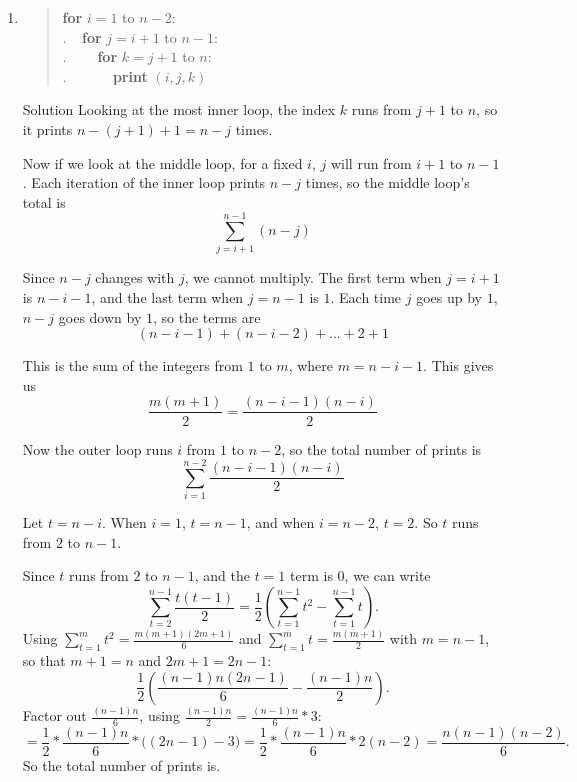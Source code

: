 \documentclass[10pt,letterpaper,unboxed,cm]{article}
\newcommand{\ind}{$~~~~~$}
\begin{document}
\begin{enumerate}
\begin{enumerate}
\begin{frame}{Solution}
Looking at the inner loop it will run \(2n-2i+1\) times.

Now summing the iterations of the inner loop over the outer loop, the total is.

\[\sum_{i=1}^n (2n-2i+1) = \sum_{i=1}^n2n - \sum_{i=1}^n2i +\sum_{i=1}^n1\]

Which will give us 

\[2n^2-(n^2+n)+n=n^2\]

Which is \(\Theta(n^2)\)


\end{frame}

\item
\begin{quote}
{\bf for} $i=1$ to $n-2$:\\
.\ind{\bf for} $j=i+1$ to $n-1$:\\
.\ind\ind{\bf for} $k=j+1$ to $n$:\\
.\ind\ind\ind {\bf print} $(i,j,k)$
\end{quote}

\begin{frame}{Solution}
Looking at the most inner loop, the index \(k\) runs from \(j+1\) to \(n\), so it prints \(n-(j+1)+1 = n-j\) times.

Now if we look at the middle loop, for a fixed \(i\), \(j\) will run from \(i+1\) to \(n-1\). Each iteration of the inner loop prints \(n-j\) times, so the middle loop's total is
\[
\sum_{j=i+1}^{n-1}(n-j)
\]

Since \(n-j\) changes with \(j\), we cannot multiply. The first term when \(j=i+1\) is \(n-i-1\), and the last term when \(j=n-1\) is \(1\). Each time \(j\) goes up by \(1\), \(n-j\) goes down by \(1\), so the terms are
\[
(n-i-1)+(n-i-2)+...+2+1
\]

This is the sum of the integers from \(1\) to \(m\), where \(m = n-i-1\). This gives us
\[
\frac{m(m+1)}{2} = \frac{(n-i-1)(n-i)}{2}
\]

Now the outer loop runs \(i\) from \(1\) to \(n-2\), so the total number of prints is
\[
\sum_{i=1}^{n-2}\frac{(n-i-1)(n-i)}{2}
\]

Let \(t=n-i\). When \(i=1\), \(t=n-1\), and when \(i=n-2\), \(t=2\). So \(t\) runs from \(2\) to \(n-1\).

Since \(t\) runs from \(2\) to \(n-1\), and the \(t=1\) term is \(0\), we can write
\[
\sum_{t=2}^{n-1} \frac{t(t-1)}{2} = \frac{1}{2}\left(\sum_{t=1}^{n-1} t^2 - \sum_{t=1}^{n-1} t\right).
\]
Using \(\sum_{t=1}^{m} t^2 = \frac{m(m+1)(2m+1)}{6}\) and \(\sum_{t=1}^{m} t = \frac{m(m+1)}{2}\) with \(m = n-1\), so that \(m+1 = n\) and \(2m+1 = 2n-1\):
\[
\frac{1}{2}\left(\frac{(n-1)n(2n-1)}{6} - \frac{(n-1)n}{2}\right).
\]
Factor out \(\frac{(n-1)n}{6}\), using \(\frac{(n-1)n}{2} = \frac{(n-1)n}{6} * 3\):
\[
= \frac{1}{2} * \frac{(n-1)n}{6} * \big((2n-1) - 3\big)
= \frac{1}{2} * \frac{(n-1)n}{6} * 2(n-2)
= \frac{n(n-1)(n-2)}{6}.
\]
So the total number of prints is.


\end{frame}
\end{enumerate}
\end{enumerate}
\end{document}
